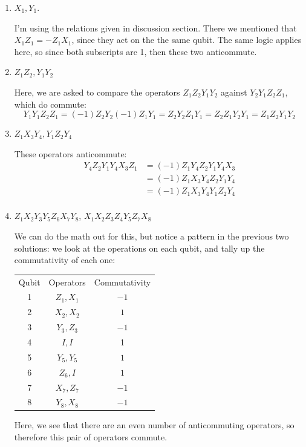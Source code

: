 \documentclass[10pt]{article}
\begin{document}
	\begin{enumerate}[label=\alph*)]
		\item \( X_1, Y_1 \).

			\begin{solution}
				I'm using the relations given in discussion section. There we mentioned that 
				\( X_1 Z_1 = - Z_1 X_1 \), since they act on the the same qubit. The same logic applies here, 
				so since both subscripts are 1, then these two anticommute. 
			\end{solution}
		\item \( Z_1Z_2, Y_1Y_2 \) 

			\begin{solution}
				Here, we are asked to compare the operators \( Z_1Z_2 Y_1 Y_2 \) against \( Y_2Y_1 Z_2Z_1 \), which 
				do commute:
				\[
				Y_1Y_1Z_2Z_1 = (-1)Z_2Y_2 (-1)Z_1Y_1 = Z_2Y_2Z_1Y_1 = Z_2Z_1Y_2Y_1 = Z_1Z_2 Y_1Y_2
				\] 
			\end{solution}
		\item \( Z_1X_3Y_4, Y_1Z_2Y_4 \) 

			\begin{solution}
				These operators anticommute:
				\begin{align*}
					Y_4Z_2Y_1Y_4X_3Z_1 &= (-1)Z_1Y_4Z_2 Y_1Y_4X_3 \\
					&= (-1) Z_1X_3Y_4Z_2Y_1Y_4 \\
					&= (-1)Z_1X_3Y_4Y_1Z_2Y_4 \\
				\end{align*}
			\end{solution}
		\item \( Z_1X_2Y_3Y_5Z_6X_7Y_8 \), \( X_1X_2Z_3Z_4Y_5Z_7X_8 \)

			\begin{solution}
				We can do the math out for this, but notice a pattern in the previous two solutions: we look at the 
				operations on each qubit, and tally up the commutativity of each one:
				\begin{center}
					\begin{tabular}{c|c|c}
						Qubit & Operators & Commutativity\\
						1 & \( Z_1, X_1 \) & \( -1 \) \\
						2 & \( X_2, X_2 \) & \( 1 \)\\
						3 & \( Y_3, Z_3 \) & \( -1 \) \\
						4 & \( I, I \) & 1\\
						5 & \( Y_5, Y_5 \) & \( 1 \) \\
						6 & \( Z_6, I \) & \( 1 \) \\
						7 & \( X_7, Z_7 \) & \( -1 \) \\
						8 &  \( Y_8, X_8 \) & \( -1 \)
					\end{tabular}
				\end{center}
				Here, we see that there are an even number of anticommuting operators, so therefore this pair 
				of operators commute. 
			\end{solution}
	\end{enumerate}
	\pagebreak
\end{document}

